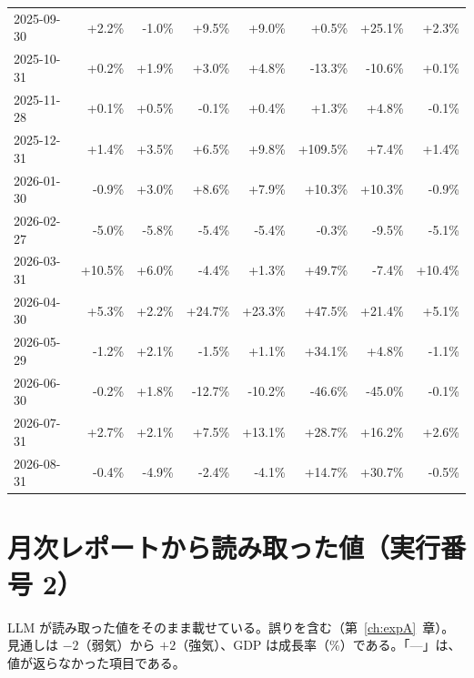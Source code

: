 \documentclass[xelatex,ja=standard,jafont=hiragino-pron,a4paper,10pt]{bxjsreport}
\newcommand{\chapref}[1]{第~\ref{#1}~章}
\begin{document}
{\begin{longtable}{lrrrrrrr}
2025-09-30 & +2.2\% & -1.0\% & +9.5\% & +9.0\% & +0.5\% & +25.1\% & +2.3\% \\
2025-10-31 & +0.2\% & +1.9\% & +3.0\% & +4.8\% & -13.3\% & -10.6\% & +0.1\% \\
2025-11-28 & +0.1\% & +0.5\% & -0.1\% & +0.4\% & +1.3\% & +4.8\% & -0.1\% \\
2025-12-31 & +1.4\% & +3.5\% & +6.5\% & +9.8\% & +109.5\% & +7.4\% & +1.4\% \\
2026-01-30 & -0.9\% & +3.0\% & +8.6\% & +7.9\% & +10.3\% & +10.3\% & -0.9\% \\
2026-02-27 & -5.0\% & -5.8\% & -5.4\% & -5.4\% & -0.3\% & -9.5\% & -5.1\% \\
2026-03-31 & +10.5\% & +6.0\% & -4.4\% & +1.3\% & +49.7\% & -7.4\% & +10.4\% \\
2026-04-30 & +5.3\% & +2.2\% & +24.7\% & +23.3\% & +47.5\% & +21.4\% & +5.1\% \\
2026-05-29 & -1.2\% & +2.1\% & -1.5\% & +1.1\% & +34.1\% & +4.8\% & -1.1\% \\
2026-06-30 & -0.2\% & +1.8\% & -12.7\% & -10.2\% & -46.6\% & -45.0\% & -0.1\% \\
2026-07-31 & +2.7\% & +2.1\% & +7.5\% & +13.1\% & +28.7\% & +16.2\% & +2.6\% \\
2026-08-31 & -0.4\% & -4.9\% & -2.4\% & -4.1\% & +14.7\% & +30.7\% & -0.5\% \\
\end{longtable}
}

\section{月次レポートから読み取った値（実行番号 2）}

LLM が読み取った値をそのまま載せている。誤りを含む（\chapref{ch:expA}）。見通しは $-2$（弱気）から $+2$（強気）、GDP は成長率（\%）である。「---」は、値が返らなかった項目である。
\end{document}
